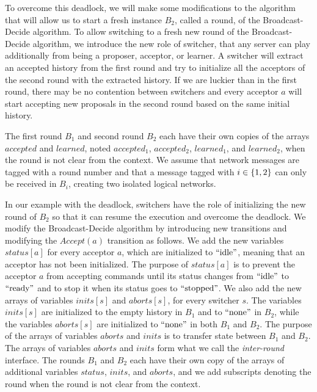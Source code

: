 \documentclass{llncs}
\begin{document}
To overcome this deadlock, we will make some modifications to the algorithm that will allow us to start a fresh instance $B_2$, called a round, of the Broadcast-Decide algorithm.
To allow switching to a fresh new round of the Broadcast-Decide algorithm, we introduce the new role of switcher, that any server can play additionally from being a proposer, acceptor, or learner.
A switcher will extract an accepted history from the first round and try to initialize all the acceptors of the second round with the extracted history.
If we are luckier than in the first round, there may be no contention between switchers and every acceptor $a$ will start accepting new proposals in the second round based on the same initial history.

The first round $B_1$ and second round $B_2$ each have their own copies of the arrays $accepted$ and $learned$, noted $accepted_1$, $accepted_2$, $learned_1$, and $learned_2$, when the round is not clear from the context. 
We assume that network messages are tagged with a round number and that a message tagged with $i\in\left\{1,2\right\}$ can only be received in $B_i$, creating two isolated logical networks. 

In our example with the deadlock, switchers have the role of initializing the new round of $B_2$ so that it can resume the execution and overcome the deadlock.
We modify the Broadcast-Decide algorithm by introducing new transitions and modifying the $Accept\left( a \right)$ transition as follows.
We add the new variables $status\left[ a \right]$ for every acceptor $a$, which are initialized to $\text{``idle''}$, meaning that an acceptor has not been initialized. The purpose of $status\left[ a \right]$ is to prevent the acceptor $a$ from accepting commands until its status changes from $\text{``idle''}$ to $\text{``ready''}$ and to stop it when its status goes to $\text{``stopped''}$.
We also add the new arrays of variables $inits\left[ s \right]$ and $aborts\left[ s \right]$, for every switcher $s$. The variables $inits\left[ s \right]$ are initialized to the empty history in $B_1$ and to $\text{``none''}$ in $B_2$, while the variables $aborts\left[ s \right]$ are initialized to $\text{``none''}$ in both $B_1$ and $B_2$. The purpose of the arrays of variables $aborts$ and $inits$ is to transfer state between $B_1$ and $B_2$. The arrays of variables $aborts$ and $inits$ form what we call the \emph{inter-round} interface.
The rounds $B_1$ and $B_2$ each have their own copy of the arrays of additional variables $status$, $inits$, and $aborts$, and we add subscripts denoting the round when the round is not clear from the context. 
\end{document}

